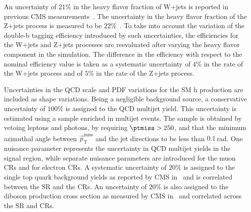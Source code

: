 An uncertainty of $21\%$ in the heavy flavor fraction of W+jets is reported in previous CMS measurements~\cite{Khachatryan:2014uva,Chatrchyan:2013uza}. The uncertainty in the heavy flavor fraction of the Z+jets process is measured to be $22\%$~\cite{Khachatryan:2014zya,Chatrchyan:2014dha}. To take into account the variation of the double-b tagging efficiency introduced by such uncertainties, the efficiencies for the W+jets and Z+jets processes are reevaluated after varying the heavy flavor component in the simulation. The difference in the efficiency with respect to the nominal efficiency value is taken as a systematic uncertainty of $4\%$ in the rate of the W+jets process and of $5\%$ in the rate of the Z+jets process. 

Uncertainties in the QCD scale and PDF variations for the SM h production are included as shape variations. Being a negligible background source, a conservative uncertainty of $100\%$ is assigned to the QCD multijet yield. This uncertainty is estimated using a sample enriched in multijet events. The sample is obtained by vetoing leptons and photons, by requiring $\ptmiss>250$\GeV, and that the minimum azimuthal angle between $\vec{p}_{\mathrm{T}}^{\mathrm{miss}}$ and the jet directions to be less than $0.1$\,rad. One nuisance parameter represents the uncertainty in QCD multijet yields in the signal region, while separate nuisance parameters are introduced for the muon CRs and for electron CRs. A systematic uncertainty of $20\%$ is assigned to the single top quark background yields as reported by CMS in~\cite{Chatrchyan:1642680} and is correlated between the SR and the CRs. An uncertainty of $20\%$ is also assigned to the diboson production cross section as measured by CMS in~\cite{Khachatryan:2016txa,Khachatryan:2016tgp} and correlated across the SR and CRs.



